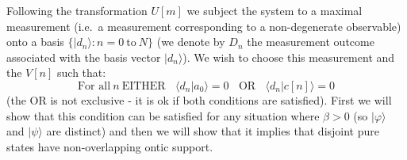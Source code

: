 \documentclass[12pt]{article}
\begin{document}
Following the transformation $U[m]$ we subject the system to a maximal measurement (i.e.\ a measurement corresponding to a non-degenerate observable) onto a basis $\{|d_n\rangle: n=0~
\text{to}~N\}$ (we denote by $D_n$ the measurement outcome associated with the basis vector $|d_n\rangle$).  We wish to choose this measurement and the $V[n]$ such that:
\begin{equation}\label{maincondition} \text{For all}~ n ~\text{EITHER} ~~~~ \langle d_n|a_0\rangle=0 ~~~~\text{OR}~~~~ \langle d_n | c[n] \rangle = 0 \end{equation} (the OR is not exclusive
- it is ok if both conditions are satisfied). First we will show that this condition can be satisfied for any situation where $\beta > 0$ (so $|\varphi\rangle$ and $|\psi\rangle$ are
distinct) and then we will show that it implies that disjoint pure states have non-overlapping ontic support.
\end{document}
